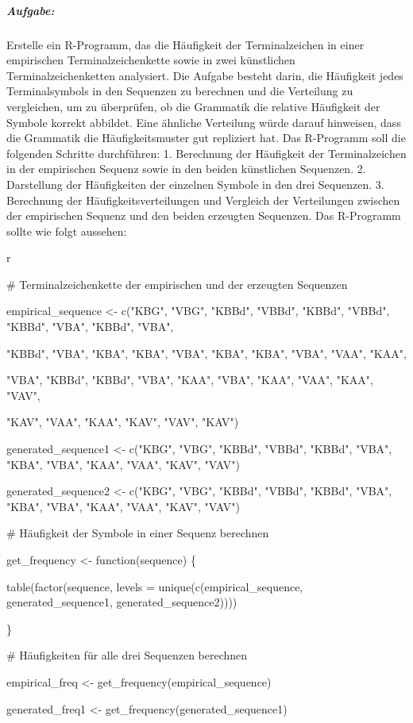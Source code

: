\documentclass[
]{article}
\begin{document}
\subparagraph{\texorpdfstring{
\textbf{Aufgabe:}}{ Aufgabe:}}\label{aufgabe-7}

Erstelle ein R-Programm, das die Häufigkeit der Terminalzeichen in einer
empirischen Terminalzeichenkette sowie in zwei künstlichen
Terminalzeichenketten analysiert. Die Aufgabe besteht darin, die
Häufigkeit jedes Terminalsymbols in den Sequenzen zu berechnen und die
Verteilung zu vergleichen, um zu überprüfen, ob die Grammatik die
relative Häufigkeit der Symbole korrekt abbildet. Eine ähnliche
Verteilung würde darauf hinweisen, dass die Grammatik die
Häufigkeitsmuster gut repliziert hat. Das R-Programm soll die folgenden
Schritte durchführen: 1. Berechnung der Häufigkeit der Terminalzeichen
in der empirischen Sequenz sowie in den beiden künstlichen Sequenzen. 2.
Darstellung der Häufigkeiten der einzelnen Symbole in den drei
Sequenzen. 3. Berechnung der Häufigkeitsverteilungen und Vergleich der
Verteilungen zwischen der empirischen Sequenz und den beiden erzeugten
Sequenzen. Das R-Programm sollte wie folgt aussehen:

r

\# Terminalzeichenkette der empirischen und der erzeugten Sequenzen

empirical\_sequence \textless- c("KBG", "VBG", "KBBd", "VBBd", "KBBd",
"VBBd", "KBBd", "VBA", "KBBd", "VBA",

"KBBd", "VBA", "KBA", "KBA", "VBA", "KBA", "KBA", "VBA", "VAA", "KAA",

"VBA", "KBBd", "KBBd", "VBA", "KAA", "VBA", "KAA", "VAA", "KAA", "VAV",

"KAV", "VAA", "KAA", "KAV", "VAV", "KAV")

generated\_sequence1 \textless- c("KBG", "VBG", "KBBd", "VBBd", "KBBd",
"VBA", "KBA", "VBA", "KAA", "VAA", "KAV", "VAV")

generated\_sequence2 \textless- c("KBG", "VBG", "KBBd", "VBBd", "KBBd",
"VBA", "KBA", "VBA", "KAA", "VAA", "KAV", "VAV")

\# Häufigkeit der Symbole in einer Sequenz berechnen

get\_frequency \textless- function(sequence) \{

table(factor(sequence, levels = unique(c(empirical\_sequence,
generated\_sequence1, generated\_sequence2))))

\}

\# Häufigkeiten für alle drei Sequenzen berechnen

empirical\_freq \textless- get\_frequency(empirical\_sequence)

generated\_freq1 \textless- get\_frequency(generated\_sequence1)
\end{document}

